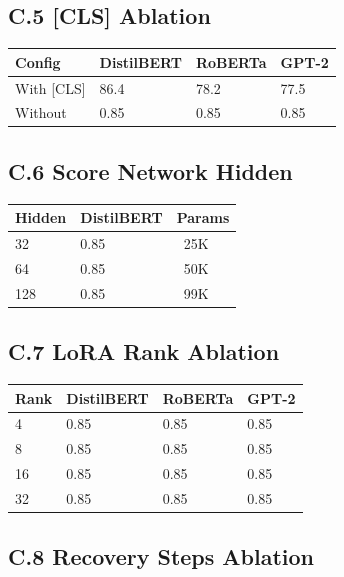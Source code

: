 {\subsection{C.5 [CLS] Ablation}

\begin{table}[H]
\centering
\small
\begin{tabular}{llll}
\toprule
\textbf{Config} & \textbf{DistilBERT} & \textbf{RoBERTa} & \textbf{GPT-2} \\
\midrule
With [CLS] & 86.4 & 78.2 & 77.5 \\
Without & 0.85 & 0.85 & 0.85 \\
\bottomrule
\end{tabular}
\end{table}

\subsection{C.6 Score Network Hidden}

\begin{table}[H]
\centering
\small
\begin{tabular}{lll}
\toprule
\textbf{Hidden} & \textbf{DistilBERT} & \textbf{Params} \\
\midrule
32 & 0.85 & ~25K \\
64 & 0.85 & ~50K \\
128 & 0.85 & ~99K \\
\bottomrule
\end{tabular}
\end{table}

\subsection{C.7 LoRA Rank Ablation}

\begin{table}[H]
\centering
\small
\begin{tabular}{llll}
\toprule
\textbf{Rank} & \textbf{DistilBERT} & \textbf{RoBERTa} & \textbf{GPT-2} \\
\midrule
4 & 0.85 & 0.85 & 0.85 \\
8 & 0.85 & 0.85 & 0.85 \\
16 & 0.85 & 0.85 & 0.85 \\
32 & 0.85 & 0.85 & 0.85 \\
\bottomrule
\end{tabular}
\end{table}

\subsection{C.8 Recovery Steps Ablation}

}
